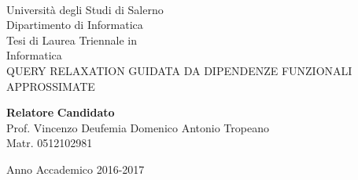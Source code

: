 \begin{center}
\\[0.2truecm]
{\Large Università degli Studi di Salerno}\\[0.2truecm]
{\large Dipartimento di Informatica}\\
\hrulefill
\vfill
{\large Tesi di Laurea Triennale in }\\[0.2truecm]
{\Large Informatica}\\
\vfill\vfill
{\large QUERY RELAXATION GUIDATA DA DIPENDENZE FUNZIONALI APPROSSIMATE}
\vfill\vfill


 {\bf Relatore} \hfill {\bf Candidato}\ \ \\
Prof. Vincenzo Deufemia \hfill Domenico Antonio Tropeano \\
\hfill Matr. 0512102981
\vfill
\hrulefill 

Anno Accademico 2016-2017

\end{center}
